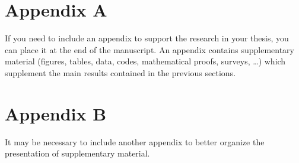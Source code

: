 \documentclass[11pt,a4paper]{article}
\begin{document}

\appendix
\section{Appendix A}
If you need to include an appendix to support the research in your thesis, you can place it at the end of the manuscript.
An appendix contains supplementary material (figures, tables, data, codes, mathematical proofs, surveys, \dots)
which supplement the main results contained in the previous sections.

\section{Appendix B}
It may be necessary to include another appendix to better organize the presentation of supplementary material.
\end{document}
